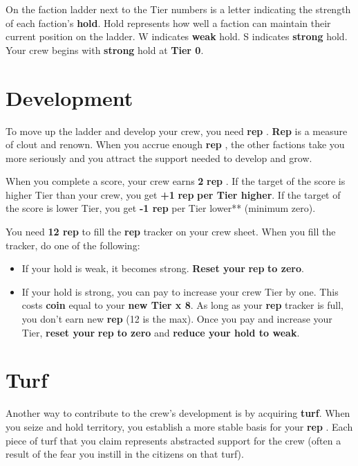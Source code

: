 \documentclass[11pt,oneside]{book}
\newcommand{\gameterm}[1]{\textbf{#1}}
\begin{document}
On the faction ladder next to the Tier numbers is a letter indicating the strength of each faction’s \textbf{hold}. Hold represents how well a faction can maintain their current position on the ladder. W indicates \textbf{weak} hold. S indicates \textbf{strong} hold. Your crew begins with \textbf{strong} hold at \textbf{Tier 0}.

\section{Development}

To move up the ladder and develop your crew, you need \gameterm{rep} . \gameterm{Rep}  is a measure of clout and renown. When you accrue enough \gameterm{rep} , the other factions take you more seriously and you attract the support needed to develop and grow.

When you complete a score, your crew earns \textbf{2 }\gameterm{rep} . If the target of the score is higher Tier than your crew, you get \textbf{+1 }\gameterm{rep} \textbf{ per Tier higher}. If the target of the score is lower Tier, you get \textbf{-1 \gameterm{rep} } per Tier lower** (minimum zero).

You need \textbf{12 \gameterm{rep} } to fill the \gameterm{rep}  tracker on your crew sheet. When you fill the tracker, do one of the following:

\begin{itemize}
	\item If your hold is weak, it becomes strong. \textbf{Reset your }\gameterm{rep} \textbf{ to zero}.
	\item If your hold is strong, you can pay to increase your crew Tier by one. This costs \gameterm{coin}  equal to your \textbf{new Tier x 8}. As long as your \gameterm{rep}  tracker is full, you don’t earn new \gameterm{rep}  (12 is the max). Once you pay and increase your Tier, \textbf{reset your }\gameterm{rep} \textbf{ to zero} and \textbf{reduce your hold to weak}.
\end{itemize}

\section{Turf}

Another way to contribute to the crew’s development is by acquiring \textbf{turf}. When you seize and hold territory, you establish a more stable basis for your \gameterm{rep} . Each piece of turf that you claim represents abstracted support for the crew (often a result of the fear you instill in the citizens on that turf).
\end{document}
